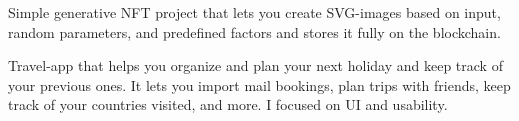 \medskip

Simple generative NFT project that lets you create SVG-images based on input, random parameters, and predefined factors and stores it fully on the blockchain.

\medskip


\divider



\medskip

Travel-app that helps you organize and plan your next holiday and keep track of your previous ones. It lets you import mail bookings, plan trips with friends, keep track of your countries visited, and more. I focused on UI and usability. 

\medskip

